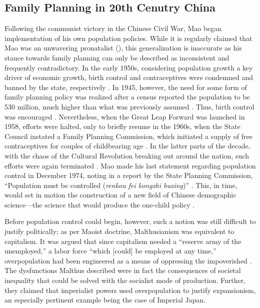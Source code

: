 \documentclass[12pt, a4paper, twoside]{article}
\begin{document}
\subsection{Family Planning in 20th Cenutry China}

Following the communist victory in the Chinese Civil War, Mao began implementation of his own population policies. While it is regularly claimed that Mao was an unwavering pronatalist (\cites{MaJian2013Guardian}{FongWang2022HRW}[pp.\ 35--52]{JisenMa1998PoliticsPopulationGrowth}), this generalization is inaccurate as his stance towards family planning can only be described as inconsistent and frequently contradictory. In the early 1950s, considering population growth a key driver of economic growth, birth control and contraceptives were condemned and banned by the state, respectively \autocite{Fitzpatrick2009TimeOneChild}. In 1945, however, the need for some form of family planning policy was realized after a census reported the population to be 530 million, much higher than what was previously assumed \autocite[pp.\ 7--8]{ZhangYangLiang2001}. Thus, birth control was encouraged \autocite[p.\ 53]{Greenhalgh2008JustOneChild}. Nevertheless, when the Great Leap Forward was launched in 1958, efforts were halted, only to briefly resume in the 1960s, when the State Council instated a Family Planning Commission, which initiated a supply of free contraceptives for couples of childbearing age \autocite[pp.\ 8--13]{Qian1983ChinaPopulationNewsletter}. In the latter parts of the decade, with the chaos of the Cultural Revolution breaking out around the nation, such efforts were again terminated \autocite[p.\ 53]{Greenhalgh2008JustOneChild}. Mao made his last statement regarding population control in December 1974, noting in a report by the State Planning Commission, “Population must be controlled (\emph{renkou fei kongzhi buxing})” \autocite[p.\ 54]{ZhangYangLiang2001}. This, in time, would set in motion the construction of a new field of Chinese demographic science---the science that would produce the one-child policy \autocite[pp.\ 68--60]{Greenhalgh2008JustOneChild}.

Before population control could begin, however, such a notion was still difficult to justify politically; as per Maoist doctrine, Malthusianism was equivalent to capitalism. It was argued that since capitalism needed a “reserve army of the unemployed,” a labor force “which [could] be employed at any time,” overpopulation had been engineered as a means of oppressing the impoverished \autocite[p.\ 938]{WangEtAl2016AJS}. The dysfunctions Malthus described were in fact the consequences of societal inequality that could be solved with the socialist mode of production. Further, they claimed that imperialist powers used overpopulation to justify expansionism, an especially pertinent example being the case of Imperial Japan.
\end{document}

